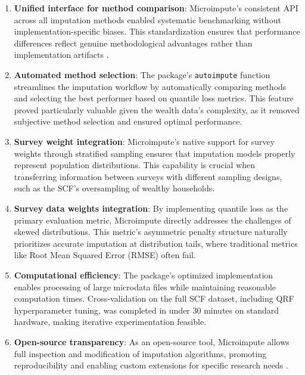 \begin{enumerate}
    \item \textbf{Unified interface for method comparison}: Microimpute's consistent API across all imputation methods enabled systematic benchmarking without implementation-specific biases. This standardization ensures that performance differences reflect genuine methodological advantages rather than implementation artifacts \citep{policyengine2025microimpute}.

    \item \textbf{Automated method selection}: The package's \texttt{autoimpute} function streamlines the imputation workflow by automatically comparing methods and selecting the best performer based on quantile loss metrics. This feature proved particularly valuable given the wealth data's complexity, as it removed subjective method selection and ensured optimal performance.

    \item \textbf{Survey weight integration}: Microimpute's native support for survey weights through stratified sampling ensures that imputation models properly represent population distributions. This capability is crucial when transferring information between surveys with different sampling designs, such as the SCF's oversampling of wealthy households.

    \item \textbf{Survey data weights integration}: By implementing quantile loss as the primary evaluation metric, Microimpute directly addresses the challenges of skewed distributions. This metric's asymmetric penalty structure naturally prioritizes accurate imputation at distribution tails, where traditional metrics like Root Mean Squared Error (RMSE) often fail.

    \item \textbf{Computational efficiency}: The package's optimized implementation enables processing of large microdata files while maintaining reasonable computation times. Cross-validation on the full SCF dataset, including QRF hyperparameter tuning, was completed in under 30 minutes on standard hardware, making iterative experimentation feasible.

    \item \textbf{Open-source transparency}: As an open-source tool, Microimpute allows full inspection and modification of imputation algorithms, promoting reproducibility and enabling custom extensions for specific research needs \citep{policyengine2025microimpute}.
\end{enumerate}

